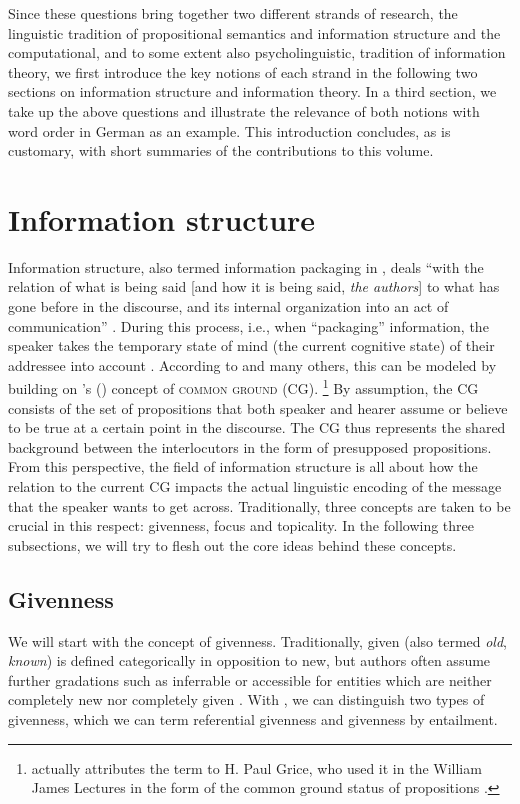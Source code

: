 \documentclass[output=paper,colorlinks,citecolor=brown]{langscibook}
\begin{document}
Since these questions bring together two different strands of research, the linguistic tradition of propositional semantics and information structure and the computational, and to some extent also psycholinguistic, tradition of information theory, we first introduce the key notions of each strand in the following two sections on information structure and information theory. In a third section, we take up the above questions and illustrate the relevance of both notions with word order in German as an example. This introduction concludes, as is customary, with short summaries of the contributions to this volume.              
 
\section{Information structure}\label{Sec:InfoStructure}
Information structure, also termed information packaging in \citet{chafe1976}, deals ``with the relation of what is being said [and how it is being said, \textit{the authors}] to what has gone before in the discourse, and its internal organization into an act of communication'' \citep[199]{halliday1967Notes}. During this process, i.e., when “packaging” information, the speaker takes the temporary state of mind (the current cognitive state) of their addressee into account \citep[28]{chafe1976}. According to \citet{krifka2007} and many others, this can be modeled by building on  \citeauthor{stalnaker1978}'s (\citeyear{stalnaker1978}) concept of \textsc{common ground} (CG).%
\footnote{\citet{stalnaker1978} actually attributes the term to H. Paul Grice, who used it in the William James Lectures in the form of the common ground status of propositions \citep{grice1989}.}
%
By assumption, the CG consists of the set of propositions that both speaker and hearer assume or believe to be true at a certain point in the discourse. The CG thus represents the shared background between the interlocutors in the form of presupposed propositions. From this perspective, the field of information structure is all about how the relation to the current CG impacts the actual linguistic encoding of the message that the speaker wants to get across. Traditionally, three concepts are taken to be crucial in this respect: givenness, focus and topicality. In the following three subsections, we will try to flesh out the core ideas behind these concepts.  

\subsection{Givenness}\label{Intro:Sec:Givenness}
We will start with the concept of givenness. Traditionally, given (also termed \textit{old}, \textit{known}) is defined categorically in opposition to new, but authors often assume further gradations such as inferrable or accessible for entities which are neither completely new nor completely given \citep[e.g.][] {chafe1976,prince1981,lambrecht1994}. With \citet[37]{krifka2007}, we can distinguish two types of givenness, which we can term referential givenness and  givenness by entailment.
\end{document}
